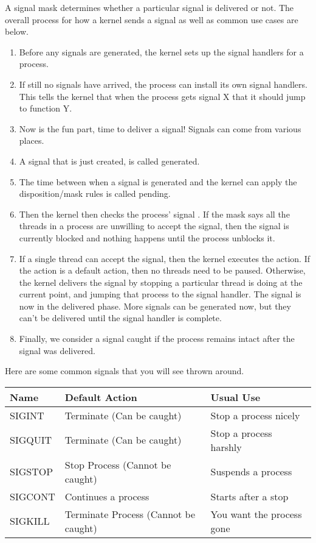A signal mask determines whether a particular signal is delivered or not.
The overall process for how a kernel sends a signal as well as common use cases are below.

\begin{enumerate}
\item Before any signals are generated, the kernel sets up the signal handlers for a process.
\item If still no signals have arrived, the process can install its own signal handlers.
  This tells the kernel that when the process gets signal X that it should jump to function Y.
\item Now is the fun part, time to deliver a signal!
  Signals can come from various places.
\item A signal that is just created, is called generated.
\item The time between when a signal is generated and the kernel can apply the disposition/mask rules is called pending.
\item Then the kernel then checks the process' signal .
  If the mask says all the threads in a process are unwilling to accept the signal, then the signal is currently blocked and nothing happens until the process unblocks it.
\item If a single thread can accept the signal, then the kernel executes the action. If the action is a default action, then no threads need to be paused.
  Otherwise, the kernel delivers the signal by stopping  a particular thread is doing at the current point, and jumping that process to the signal handler.
  The signal is now in the delivered phase.
  More signals can be generated now, but they can't be delivered until the signal handler is complete.
\item Finally, we consider a signal caught if the process remains intact after the signal was delivered.
\end{enumerate}

Here are some common signals that you will see thrown around.

\begin{tabular}{|l|l|l|}
Name & Default Action & Usual Use \\ \hline
SIGINT & Terminate (Can be caught) & Stop a process nicely \\
SIGQUIT & Terminate (Can be caught) & Stop a process harshly \\
SIGSTOP & Stop Process (Cannot be caught) & Suspends a process \\
SIGCONT & Continues a process & Starts after a stop \\
SIGKILL & Terminate Process (Cannot be caught) & You want the process gone \\
\end{tabular}

